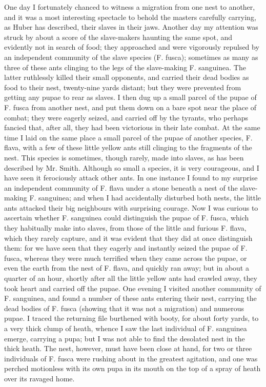 One day I fortunately chanced to witness a migration from one nest to another, and it was a most interesting spectacle to behold the masters carefully carrying, as Huber has described, their slaves in their jaws. Another day my attention was struck by about a score of the slave-makers haunting the same spot, and evidently not in search of food; they approached and were vigorously repulsed by an independent community of the slave species (F. fusca); sometimes as many as three of these ants clinging to the legs of the slave-making F. sanguinea. The latter ruthlessly killed their small opponents, and carried their dead bodies as food to their nest, twenty-nine yards distant; but they were prevented from getting any pupae to rear as slaves. I then dug up a small parcel of the pupae of F. fusca from another nest, and put them down on a bare spot near the place of combat; they were eagerly seized, and carried off by the tyrants, who perhaps fancied that, after all, they had been victorious in their late combat.
At the same time I laid on the same place a small parcel of the pupae of another species, F. flava, with a few of these little yellow ants still clinging to the fragments of the nest. This species is sometimes, though rarely, made into slaves, as has been described by Mr. Smith. Although so small a species, it is very courageous, and I have seen it ferociously attack other ants. In one instance I found to my surprise an independent community of F. flava under a stone beneath a nest of the slave-making F. sanguinea; and when I had accidentally disturbed both nests, the little ants attacked their big neighbours with surprising courage. Now I was curious to ascertain whether F. sanguinea could distinguish the pupae of F. fusca, which they habitually make into slaves, from those of the little and furious F. flava, which they rarely capture, and it was evident that they did at once distinguish them: for we have seen that they eagerly and instantly seized the pupae of F. fusca, whereas they were much terrified when they came across the pupae, or even the earth from the nest of F. flava, and quickly ran away; but in about a quarter of an hour, shortly after all the little yellow ants had crawled away, they took heart and carried off the pupae.
One evening I visited another community of F. sanguinea, and found a number of these ants entering their nest, carrying the dead bodies of F. fusca (showing that it was not a migration) and numerous pupae. I traced the returning file burthened with booty, for about forty yards, to a very thick clump of heath, whence I saw the last individual of F. sanguinea emerge, carrying a pupa; but I was not able to find the desolated nest in the thick heath. The nest, however, must have been close at hand, for two or three individuals of F. fusca were rushing about in the greatest agitation, and one was perched motionless with its own pupa in its mouth on the top of a spray of heath over its ravaged home.
